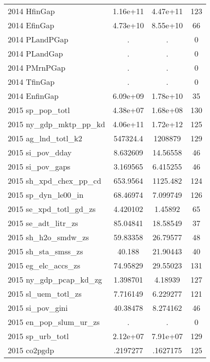 {\begin{tabular}{l*{1}{ccc}}
2014 HfinGap        &    1.16e+11&    4.47e+11&         123\\
2014 EfinGap        &    4.73e+10&    8.55e+10&          66\\
2014 PLandPGap      &           .&           .&           0\\
2014 PLandGap       &           .&           .&           0\\
2014 PMrnPGap       &           .&           .&           0\\
2014 TfinGap        &           .&           .&           0\\
2014 EnfinGap       &    6.09e+09&    1.78e+10&          35\\
2015 sp\_pop\_totl    &    4.38e+07&    1.68e+08&         130\\
2015 ny\_gdp\_mktp\_pp\_kd&    4.06e+11&    1.72e+12&         125\\
2015 ag\_lnd\_totl\_k2 &    547324.4&     1208879&         129\\
2015 si\_pov\_dday    &    8.632609&    14.56558&          46\\
2015 si\_pov\_gaps    &    3.169565&    6.415255&          46\\
2015 sh\_xpd\_chex\_pp\_cd&    653.9564&    1125.482&         124\\
2015 sp\_dyn\_le00\_in &    68.46974&    7.099749&         126\\
2015 se\_xpd\_totl\_gd\_zs&    4.420102&     1.45892&          65\\
2015 se\_adt\_litr\_zs &    85.04841&    18.58549&          37\\
2015 sh\_h2o\_smdw\_zs &    59.83358&    26.79577&          48\\
2015 sh\_sta\_smss\_zs &      40.188&    21.90443&          40\\
2015 eg\_elc\_accs\_zs &    74.95829&    29.55023&         131\\
2015 ny\_gdp\_pcap\_kd\_zg&    1.398701&     4.18939&         127\\
2015 sl\_uem\_totl\_zs &    7.716149&    6.229277&         121\\
2015 si\_pov\_gini    &    40.38478&    8.274162&          46\\
2015 en\_pop\_slum\_ur\_zs&           .&           .&           0\\
2015 sp\_urb\_totl    &    2.12e+07&    7.91e+07&         129\\
2015 co2pgdp        &    .2197277&    .1627175&         125\\

\end{tabular}}
